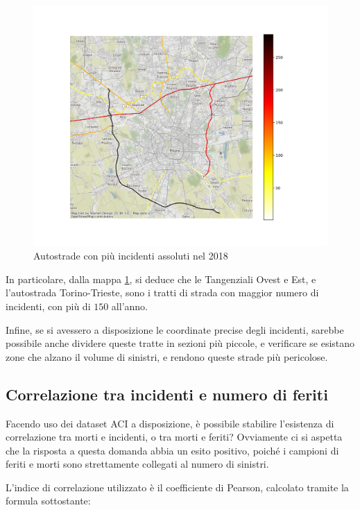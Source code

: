 \documentclass[a4paper]{report}
\begin{document}
\begin{figure}
    \includegraphics[width=\linewidth]{../src/incidenti/incidenti_aci/autostrade/incidenti_line_chart.png}
    \caption{Autostrade con più incidenti assoluti nel 2018}
    \label{fig:line-incidenti-milano}
\end{figure}

In particolare, dalla mappa \ref{fig:line-incidenti-milano}, si deduce che le 
Tangenziali Ovest e Est, e l'autostrada Torino-Trieste, sono i tratti di 
strada con maggior numero di incidenti, con più di $150$ all'anno. 

Infine, se si avessero a disposizione le coordinate precise degli incidenti, 
sarebbe possibile anche dividere queste tratte in sezioni più piccole, 
e verificare se esistano zone che alzano il volume di sinistri, e rendono queste strade 
più pericolose. 


\subsection{Correlazione tra incidenti e numero di feriti}

Facendo uso dei dataset ACI a disposizione, è possibile stabilire l'esistenza di 
correlazione tra morti e incidenti, o tra morti e feriti?
Ovviamente ci si aspetta che la risposta a questa domanda abbia un 
esito positivo, poiché 
i campioni di feriti e morti sono strettamente collegati al numero di sinistri. 

L'indice di correlazione utilizzato è il coefficiente di Pearson, 
calcolato tramite la formula sottostante: 
\end{document}
